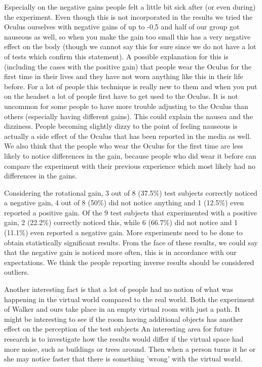 Especially on the negative gains people felt a little bit sick after (or even during) the experiment.
Even though this is not incorporated in the results we tried the Oculus ourselves with negative gains of up to -0,5 and half of our group got nauseous as well, so when you make the gain too small this has a very negative effect on the body (though we cannot say this for sure since we do not have a lot of tests which confirm this statement).
A possible explanation for this is (including the cases with the positive gain) that people wear the Oculus for the first time in their lives and they have not worn anything like this in their life before.
For a lot of people this technique is really new to them and when you put on the headset a lot of people first have to get used to the Oculus. 
It is not uncommon for some people to have more trouble adjusting to the Oculus than others (especially having different gains).
This could explain the nausea and the dizziness.
People becoming slightly dizzy to the point of feeling nauseous is actually a side effect of the Oculus that has been reported in the media as well.
We also think that the people who wear the Oculus  for the first time are less likely to notice differences in the gain, because people who did wear it before can compare the experiment with their previous experience which most likely had no differences in the gains. 

Considering the rotational gain, 3 out of 8 (37.5\%) test subjects correctly noticed a negative gain, 4 out of 8 (50\%) did not notice anything and 1 (12.5\%) even reported a positive gain.
Of the 9 test subjects that experimented with a positive gain, 2 (22.2\%) correctly noticed this, while 6 (66.7\%) did not notice and 1 (11.1\%) even reported a negative gain.
More experiments need to be done to obtain statistically significant results.
From the face of these results, we could say that the negative gain is noticed more often, this is in accordance with our expectations.
We think the people reporting inverse results should be considered outliers.

Another interesting fact is that a lot of people had no notion of what was happening in the virtual world compared to the real world.
Both the experiment of Walker \cite{jwalker} and ours take place in an empty virtual room with just a path.
It might be interesting to see if the room having additional objects has another effect on the perception of the test subjects
An interesting area for future research is to investigate how the results would differ if the virtual space had more noise, such as buildings or trees around.
Then when a person turns it he or she may notice faster that there is something 'wrong'  with the virtual world.

